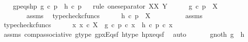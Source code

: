 \begin{isabellebody}
\ \ \isamarkupfalse%
\ gp{\isacharunderscore}{\kern0pt}eqs{\isacharunderscore}{\kern0pt}hp{\isacharcolon}{\kern0pt}\ {\isachardoublequoteopen}g\ {\isasymcirc}\isactrlsub c\ p\ {\isacharequal}{\kern0pt}\ h\ {\isasymcirc}\isactrlsub c\ p{\isachardoublequoteclose}\isanewline
\ \ \isamarkupfalse%
{\isacharparenleft}{\kern0pt}rule\ one{\isacharunderscore}{\kern0pt}separator{\isacharbrackleft}{\kern0pt}\ X{\isacharequal}{\kern0pt}X{\isacharcomma}{\kern0pt}\ Y{\isacharequal}{\kern0pt}{\isasymOmega}{\isacharbrackright}{\kern0pt}{\isacharparenright}{\kern0pt}\isanewline
\ \ \ \ \isamarkupfalse%
\ {\isachardoublequoteopen}g\ {\isasymcirc}\isactrlsub c\ p\ {\isacharcolon}{\kern0pt}\ X\ {\isasymrightarrow}\ {\isasymOmega}{\isachardoublequoteclose}\isanewline
\ \ \ \ \ \ \isamarkupfalse%
\ assms\ \isamarkupfalse%
\ typecheck{\isacharunderscore}{\kern0pt}cfuncs\isanewline
\ \ \ \ \isamarkupfalse%
\ {\isachardoublequoteopen}h\ {\isasymcirc}\isactrlsub c\ p\ {\isacharcolon}{\kern0pt}\ X\ {\isasymrightarrow}\ {\isasymOmega}{\isachardoublequoteclose}\isanewline
\ \ \ \ \ \ \isamarkupfalse%
\ assms\ \isamarkupfalse%
\ typecheck{\isacharunderscore}{\kern0pt}cfuncs\isanewline
\ \ \ \ \isamarkupfalse%
\ {\isachardoublequoteopen}{\isasymAnd}x{\isachardot}{\kern0pt}\ x\ {\isasymin}\isactrlsub c\ X\ {\isasymLongrightarrow}\ {\isacharparenleft}{\kern0pt}g\ {\isasymcirc}\isactrlsub c\ p{\isacharparenright}{\kern0pt}\ {\isasymcirc}\isactrlsub c\ x\ {\isacharequal}{\kern0pt}\ {\isacharparenleft}{\kern0pt}h\ {\isasymcirc}\isactrlsub c\ p{\isacharparenright}{\kern0pt}\ {\isasymcirc}\isactrlsub c\ x{\isachardoublequoteclose}\isanewline
\ \ \ \ \ \ \isamarkupfalse%
\ assms{\isacharparenleft}{\kern0pt}{}{\isacharparenright}{\kern0pt}\ comp{\isacharunderscore}{\kern0pt}associative{}\ g{\isacharunderscore}{\kern0pt}type\ gpx{\isacharunderscore}{\kern0pt}Eqs{\isacharunderscore}{\kern0pt}f\ h{\isacharunderscore}{\kern0pt}type\ hpx{\isacharunderscore}{\kern0pt}eqs{\isacharunderscore}{\kern0pt}f\ \isamarkupfalse%
\ auto\isanewline
\ \ \isamarkupfalse%
\isanewline
\ \ \isamarkupfalse%
\ g{\isacharunderscore}{\kern0pt}not{\isacharunderscore}{\kern0pt}h{\isacharcolon}{\kern0pt}\ {\isachardoublequoteopen}g\ {\isasymnoteq}\ h{\isachardoublequoteclose}\isanewline
\ \ \isamarkupfalse%
\ {\isacharminus}{\kern0pt}\isanewline

\end{isabellebody}
